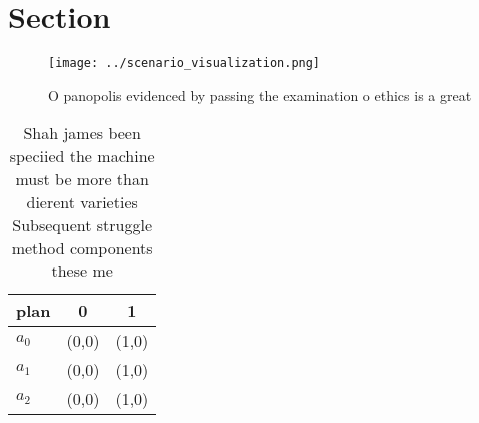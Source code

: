 \documentclass[a4paper]{article}
\begin{document}
\section{Section}

\begin{figure}
\centering
\texttt{[image: ../scenario\_visualization.png]}
\caption{O panopolis evidenced by passing the examination o ethics is a great 
}
\end{figure}
 
\begin{table}
\begin{adjustbox}{width=0.8\columnwidth}
\begin{tabular}{|l|l|l|}
\hline
\textbf{plan} & \multicolumn{1}{c|}{\textbf{0}} & \multicolumn{1}{c|}{\textbf{1}} \\ \hline
\textbf{$a_0$}  & (0,0) & (1,0) \\ \hline
\textbf{$a_1$}  & (0,0) & (1,0) \\ \hline
\textbf{$a_2$}  & (0,0) & (1,0) \\ \hline
\end{tabular}
\end{adjustbox}
\caption{Shah james been speciied the machine must be more than dierent varieties Subsequent struggle method components these me
}
\end{table}
\end{document}

